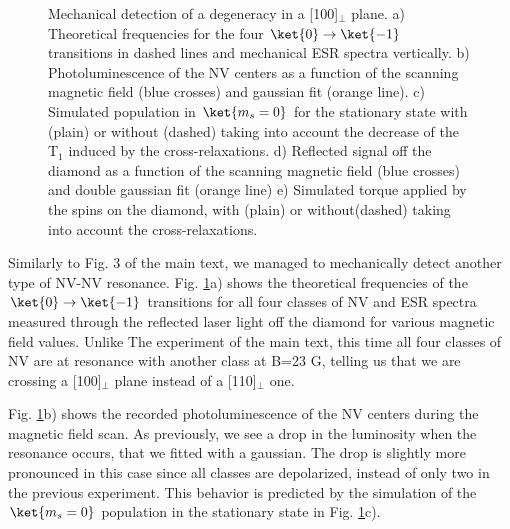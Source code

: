 \documentclass[preprintnumbers,amsmath,amssymb,onecolumn,12pt]{revtex4}
\begin{document}
\begin{figure}[!ht]
  \centering {}
  \caption{Mechanical detection of a degeneracy in a [100]$_\perp$ plane. a) Theoretical frequencies for the four $\ket{0} \to \ket{-1}$ transitions in dashed lines and mechanical ESR spectra vertically. b) Photoluminescence of the NV centers as a function of the scanning magnetic field (blue crosses) and gaussian fit (orange line). c) Simulated population in $\ket{m_s=0}$ for the stationary state with (plain) or without (dashed) taking into account the decrease of the T$_1$ induced by the cross-relaxations.
  d) Reflected signal off the diamond as a function of the scanning magnetic field (blue crosses) and double gaussian fit (orange line) e) Simulated torque applied by the spins on the diamond, with (plain) or without(dashed) taking into account the cross-relaxations.}
	\label{CR_22}
\end{figure}

Similarly to Fig. 3 of the main text, we managed to mechanically detect another type of NV-NV resonance. Fig. \ref{CR_22}a) shows the theoretical frequencies of the $\ket{0} \to \ket{-1}$ transitions for all four classes of NV and ESR spectra measured through the reflected laser light off the diamond for various magnetic field values. Unlike The experiment of the main text, this time all four classes of NV are at resonance with another class at B=23 G, telling us that we are crossing a [100]$_\perp$ plane instead of a [110]$_\perp$ one.

Fig. \ref{CR_22}b) shows the recorded photoluminescence of the NV centers during the magnetic field scan. As previously, we see a drop in the luminosity when the resonance occurs, that we fitted with a gaussian. The drop is slightly more pronounced in this case since all classes are depolarized, instead of only two in the previous experiment. This behavior is predicted by the simulation of the $\ket{m_s=0}$ population in the stationary state in Fig. \ref{CR_22}c).
\end{document}
